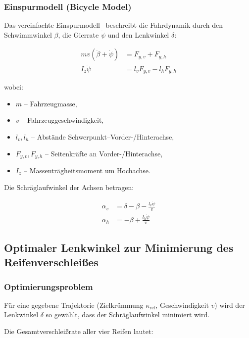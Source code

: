 ﻿\documentclass[12pt,a4paper]{article}
\theoremstyle{definition}
\theoremstyle{remark}
\begin{document}
\subsubsection{Einspurmodell (Bicycle Model)}

Das vereinfachte Einspurmodell~\cite{Rajamani2006} beschreibt die Fahrdynamik
durch den Schwimmwinkel $\beta$, die Gierrate $\dot{\psi}$ und den Lenkwinkel $\delta$:

\begin{align}
  m v (\dot{\beta} + \dot{\psi}) &= F_{y,v} + F_{y,h} \label{eq:bicycle1}\\
  I_z \ddot{\psi} &= l_v F_{y,v} - l_h F_{y,h} \label{eq:bicycle2}
\end{align}

wobei:
\begin{itemize}[nosep]
  \item $m$ -- Fahrzeugmasse,
  \item $v$ -- Fahrzeuggeschwindigkeit,
  \item $l_v, l_h$ -- Abstände Schwerpunkt--Vorder-/Hinterachse,
  \item $F_{y,v}, F_{y,h}$ -- Seitenkräfte an Vorder-/Hinterachse,
  \item $I_z$ -- Massenträgheitsmoment um Hochachse.
\end{itemize}

Die Schräglaufwinkel der Achsen betragen:

\begin{align}
  \alpha_v &= \delta - \beta - \frac{l_v \dot{\psi}}{v} \label{eq:alpha_v}\\
  \alpha_h &= -\beta + \frac{l_h \dot{\psi}}{v} \label{eq:alpha_h}
\end{align}

\subsection{Optimaler Lenkwinkel zur Minimierung des Reifenverschleißes}

\subsubsection{Optimierungsproblem}

Für eine gegebene Trajektorie (Zielkrümmung $\kappa_{\mathrm{ref}}$, Geschwindigkeit $v$)
wird der Lenkwinkel $\delta$ so gewählt, dass der Schräglaufwinkel minimiert wird.

Die Gesamtverschleißrate aller vier Reifen lautet:
\end{document}
